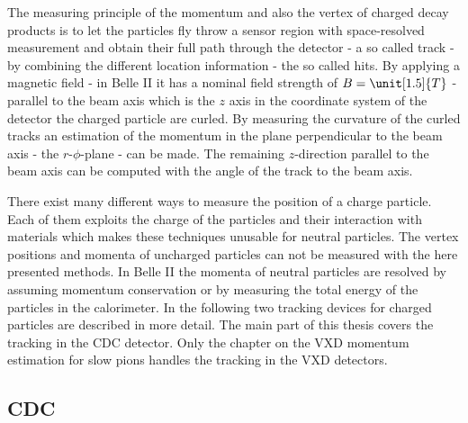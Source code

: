 The measuring principle of the momentum and also the vertex of charged decay products is to let the particles fly throw a sensor region with space-resolved measurement and obtain their full path through the detector - a so called track - by combining the different location information - the so called hits. By applying a magnetic field - in Belle II it has a nominal field strength of $B = \unit[1.5]{T}$ - parallel to the beam axis which is the $z$ axis in the coordinate system of the detector the charged particle are curled. By measuring the curvature of the curled tracks an estimation of the momentum in the plane perpendicular to the beam axis - the $r$-$\phi$-plane - can be made. The remaining $z$-direction parallel to the beam axis can be computed with the angle of the track to the beam axis.

There exist many different ways to measure the position of a charge particle. Each of them exploits the charge of the particles and their interaction with materials which makes these techniques unusable for neutral particles. The vertex positions and momenta of uncharged particles can not be measured with the here presented methods. In Belle II the momenta of neutral particles are resolved by assuming momentum conservation or by measuring the total energy of the particles in the calorimeter. In the following two tracking devices for charged particles are described in more detail. The main part of this thesis covers the tracking in the CDC detector. Only the chapter on the VXD momentum estimation for slow pions handles the tracking in the VXD detectors.

\subsection{CDC}

